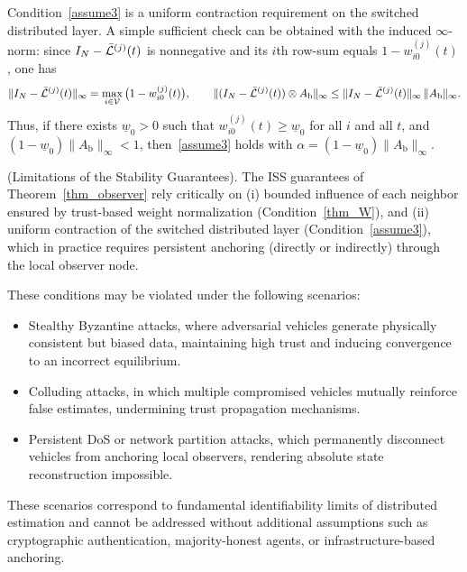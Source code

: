 \begin{remark}
Condition~\eqref{assume3} is a uniform contraction requirement on the switched distributed layer.
A simple sufficient check can be obtained with the induced $\infty$-norm: since $I_N-\bar{\mathcal{L}}^{(j)}(t)$ is nonnegative and its $i$th row-sum equals $1-w_{i0}^{(j)}(t)$, one has
\[
\|I_N-\bar{\mathcal{L}}^{(j)}(t)\|_\infty=\max_{i\in\mathcal{V}}\big(1-w_{i0}^{(j)}(t)\big),
\qquad
\|(I_N-\bar{\mathcal{L}}^{(j)}(t))\otimes A_{\text{b}}\|_\infty \le \|I_N-\bar{\mathcal{L}}^{(j)}(t)\|_\infty\,\|A_{\text{b}}\|_\infty.
\]
Thus, if there exists $\underline{w}_0>0$ such that $w_{i0}^{(j)}(t)\ge \underline{w}_0$ for all $i$ and all $t$, and $(1-\underline{w}_0)\|A_{\text{b}}\|_\infty<1$, then~\eqref{assume3} holds with $\alpha=(1-\underline{w}_0)\|A_{\text{b}}\|_\infty$.
\end{remark}
\vspace*{-0.3cm}

\begin{remark} (Limitations of the Stability Guarantees).
The ISS guarantees of Theorem~\ref{thm_observer} rely critically on (i) bounded influence of each neighbor ensured by trust-based weight normalization (Condition~\ref{thm_W}), and (ii) uniform contraction of the switched distributed layer (Condition~\eqref{assume3}), which in practice requires persistent anchoring (directly or indirectly) through the local observer node.

These conditions may be violated under the following scenarios:
\begin{itemize}
    \item Stealthy Byzantine attacks, where adversarial vehicles generate physically consistent but biased data, maintaining high trust and inducing convergence to an incorrect equilibrium.
    \item Colluding attacks, in which multiple compromised vehicles mutually reinforce false estimates, undermining trust propagation mechanisms.
    \item Persistent DoS or network partition attacks, which permanently disconnect vehicles from anchoring local observers, rendering absolute state reconstruction impossible.
\end{itemize}

These scenarios correspond to fundamental identifiability limits of distributed estimation and cannot be addressed without additional assumptions such as cryptographic authentication, majority-honest agents, or infrastructure-based anchoring.
\end{remark}

